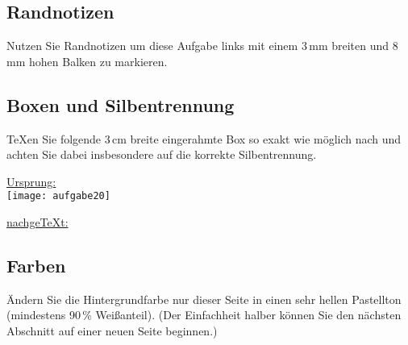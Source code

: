 \subsection{Randnotizen}
\begin{aufgabe}
Nutzen Sie Randnotizen um diese Aufgabe links mit einem 3\,mm breiten und 8\,mm hohen Balken zu markieren.

\reversemarginpar
\marginpar{\rule[0pt]{3mm}{8mm}}
\end{aufgabe}

\subsection{Boxen und Silbentrennung}
\begin{aufgabe}
\TeX en Sie folgende 3\,cm breite eingerahmte Box so exakt wie m\"oglich nach und achten Sie dabei insbesondere auf die korrekte Silbentrennung.
\end{aufgabe}

\noindent \underline{Ursprung:} \\
\noindent\texttt{[image: aufgabe20]}

\noindent \underline{nachge\TeX t:}\\
\indent \hspace{-0.7cm}

\subsection{Farben}
\begin{aufgabe}
\"Andern Sie die Hintergrundfarbe nur dieser Seite in einen sehr hellen Pastellton (mindestens 90\,\% Wei\ss{}anteil). (Der Einfachheit halber k\"onnen Sie den n\"achsten Abschnitt auf einer neuen Seite beginnen.)
\end{aufgabe}
\pagecolor{LightGrey}